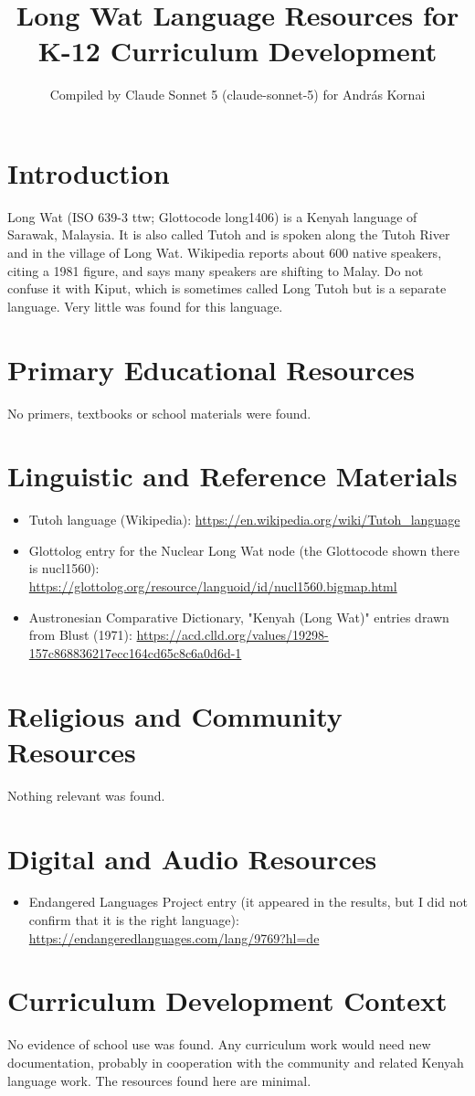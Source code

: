 \documentclass[12pt]{article}
\title{Long Wat Language Resources for K-12 Curriculum Development}
\author{Compiled by Claude Sonnet 5 (claude-sonnet-5) for Andr\'as Kornai}
\date{}
\begin{document}
\maketitle

\section{Introduction}
Long Wat (ISO 639-3 ttw; Glottocode long1406) is a Kenyah language of Sarawak, Malaysia. It is also called Tutoh and is spoken along the Tutoh River and in the village of Long Wat. Wikipedia reports about 600 native speakers, citing a 1981 figure, and says many speakers are shifting to Malay. Do not confuse it with Kiput, which is sometimes called Long Tutoh but is a separate language. Very little was found for this language.

\section{Primary Educational Resources}
No primers, textbooks or school materials were found.

\section{Linguistic and Reference Materials}
\begin{itemize}
\item Tutoh language (Wikipedia): \url{https://en.wikipedia.org/wiki/Tutoh_language}
\item Glottolog entry for the Nuclear Long Wat node (the Glottocode shown there is nucl1560): \url{https://glottolog.org/resource/languoid/id/nucl1560.bigmap.html}
\item Austronesian Comparative Dictionary, "Kenyah (Long Wat)" entries drawn from Blust (1971): \url{https://acd.clld.org/values/19298-157c868836217ecc164cd65c8c6a0d6d-1}
\end{itemize}

\section{Religious and Community Resources}
Nothing relevant was found.

\section{Digital and Audio Resources}
\begin{itemize}
\item Endangered Languages Project entry (it appeared in the results, but I did not confirm that it is the right language): \url{https://endangeredlanguages.com/lang/9769?hl=de}
\end{itemize}

\section{Curriculum Development Context}
No evidence of school use was found. Any curriculum work would need new documentation, probably in cooperation with the community and related Kenyah language work. The resources found here are minimal.
\end{document}
